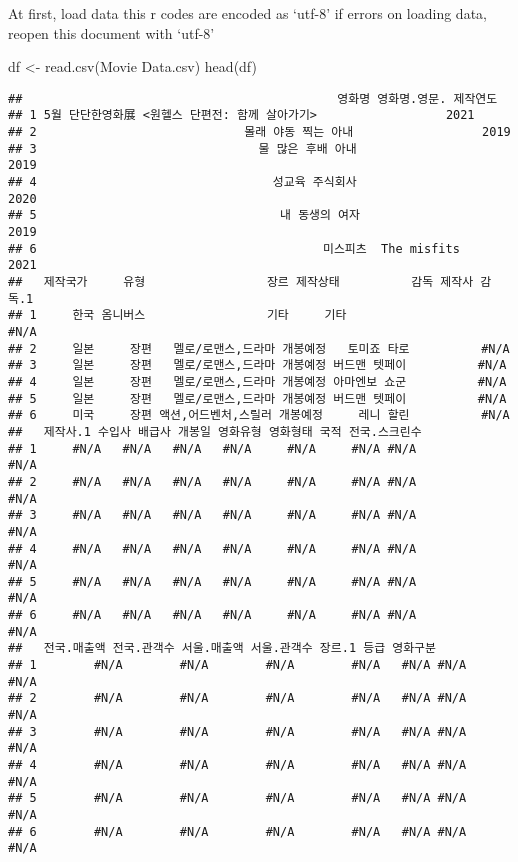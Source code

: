 \documentclass[
]{article}
\newenvironment{Shaded}{\begin{snugshade}}{\end{snugshade}}
\newcommand{\FunctionTok}[1]{\textcolor[rgb]{0.00,0.00,0.00}{#1}}
\newcommand{\NormalTok}[1]{#1}
\newcommand{\OtherTok}[1]{\textcolor[rgb]{0.56,0.35,0.01}{#1}}
\newcommand{\StringTok}[1]{\textcolor[rgb]{0.31,0.60,0.02}{#1}}
\begin{document}
At first, load data this r codes are encoded as `utf-8' if errors on
loading data, reopen this document with `utf-8'

\begin{Shaded}
\begin{Highlighting}[]
\NormalTok{df }\OtherTok{\textless{}{-}} \FunctionTok{read.csv}\NormalTok{(}\StringTok{\textquotesingle{}Movie Data.csv\textquotesingle{}}\NormalTok{)}
\FunctionTok{head}\NormalTok{(df)}
\end{Highlighting}
\end{Shaded}

\begin{verbatim}
##                                            영화명 영화명.영문. 제작연도
## 1 5월 단단한영화展 <원헬스 단편전: 함께 살아가기>                  2021
## 2                             몰래 야동 찍는 아내                  2019
## 3                               물 많은 후배 아내                  2019
## 4                                 성교육 주식회사                  2020
## 5                                  내 동생의 여자                  2019
## 6                                        미스피츠  The misfits     2021
##   제작국가     유형                 장르 제작상태          감독 제작사 감독.1
## 1     한국 옴니버스                 기타     기타                        #N/A
## 2     일본     장편   멜로/로맨스,드라마 개봉예정   토미죠 타로          #N/A
## 3     일본     장편   멜로/로맨스,드라마 개봉예정 버드맨 텟페이          #N/A
## 4     일본     장편   멜로/로맨스,드라마 개봉예정 아마엔보 쇼군          #N/A
## 5     일본     장편   멜로/로맨스,드라마 개봉예정 버드맨 텟페이          #N/A
## 6     미국     장편 액션,어드벤처,스릴러 개봉예정     레니 할린          #N/A
##   제작사.1 수입사 배급사 개봉일 영화유형 영화형태 국적 전국.스크린수
## 1     #N/A   #N/A   #N/A   #N/A     #N/A     #N/A #N/A          #N/A
## 2     #N/A   #N/A   #N/A   #N/A     #N/A     #N/A #N/A          #N/A
## 3     #N/A   #N/A   #N/A   #N/A     #N/A     #N/A #N/A          #N/A
## 4     #N/A   #N/A   #N/A   #N/A     #N/A     #N/A #N/A          #N/A
## 5     #N/A   #N/A   #N/A   #N/A     #N/A     #N/A #N/A          #N/A
## 6     #N/A   #N/A   #N/A   #N/A     #N/A     #N/A #N/A          #N/A
##   전국.매출액 전국.관객수 서울.매출액 서울.관객수 장르.1 등급 영화구분
## 1        #N/A        #N/A        #N/A        #N/A   #N/A #N/A     #N/A
## 2        #N/A        #N/A        #N/A        #N/A   #N/A #N/A     #N/A
## 3        #N/A        #N/A        #N/A        #N/A   #N/A #N/A     #N/A
## 4        #N/A        #N/A        #N/A        #N/A   #N/A #N/A     #N/A
## 5        #N/A        #N/A        #N/A        #N/A   #N/A #N/A     #N/A
## 6        #N/A        #N/A        #N/A        #N/A   #N/A #N/A     #N/A
\end{verbatim}
\end{document}
